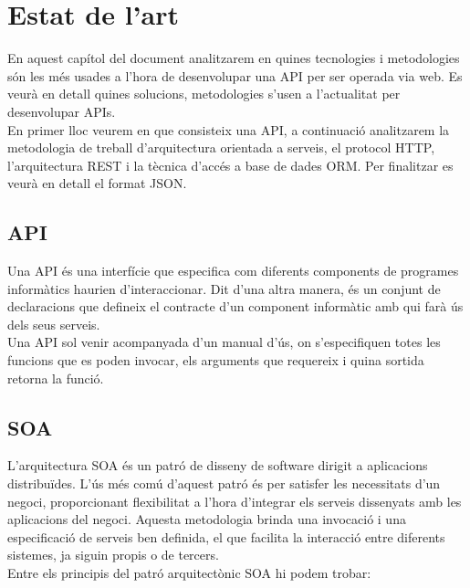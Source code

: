
\chapter{Estat de l'art}\label{entorn}

En aquest capítol del document analitzarem en quines tecnologies i metodologies són les més usades a l'hora de desenvolupar una \ac{API} per ser operada via web. Es veurà en detall quines solucions, metodologies s'usen a l'actualitat per desenvolupar \ac{API}s.\\
En primer lloc veurem en que consisteix una \ac{API}, a continuació analitzarem la metodologia de treball d'arquitectura orientada a serveis, el protocol \ac{HTTP}, l'arquitectura \ac{REST} i la tècnica d'accés a base de dades \ac{ORM}. Per finalitzar es veurà en detall el format \ac{JSON}.

\section{\ac{API}}\label{sec_api}

Una \ac{API} és una interfície que especifica com diferents components de programes informàtics haurien d'interaccionar. Dit d'una altra manera, és un conjunt de declaracions que defineix el contracte d'un component informàtic amb qui farà ús dels seus serveis.\\

Una \ac{API} sol venir acompanyada d'un manual d'ús, on s'especifiquen totes les funcions que es poden invocar, els arguments que requereix i quina sortida retorna la funció.

\section{\ac{SOA}} \label{sec_soa}

L'arquitectura \ac{SOA} és un patró de disseny de software dirigit a aplicacions distribuïdes. L'ús més comú d'aquest patró és per satisfer les necessitats d'un negoci, proporcionant flexibilitat a l'hora d'integrar els serveis dissenyats amb les aplicacions del negoci. Aquesta metodologia brinda una invocació i una especificació de serveis ben definida, el que facilita la interacció entre diferents sistemes, ja siguin propis o de tercers.\\
\newline
Entre els principis del patró arquitectònic \ac{SOA} hi podem trobar:

